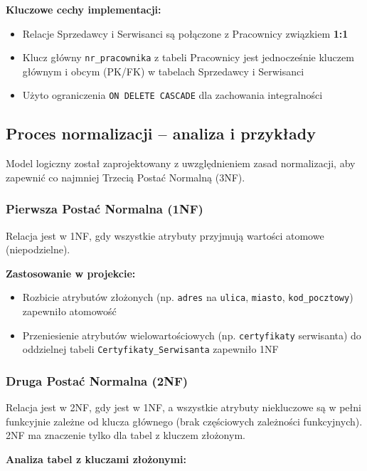 \documentclass[a4paper,titleauthor]{mwart}
\begin{document}
	\textbf{Kluczowe cechy implementacji:}
	\begin{itemize}
		\item Relacje Sprzedawcy i Serwisanci są połączone z Pracownicy związkiem \textbf{1:1}
		\item Klucz główny \texttt{nr\_pracownika} z tabeli Pracownicy jest jednocześnie kluczem głównym i obcym (PK/FK) w tabelach Sprzedawcy i Serwisanci
		\item Użyto ograniczenia \texttt{ON DELETE CASCADE} dla zachowania integralności
	\end{itemize}

	\subsection{Proces normalizacji -- analiza i przykłady}

	Model logiczny został zaprojektowany z uwzględnieniem zasad normalizacji, aby zapewnić co najmniej Trzecią Postać Normalną (3NF).

	\subsubsection{Pierwsza Postać Normalna (1NF)}

	Relacja jest w 1NF, gdy wszystkie atrybuty przyjmują wartości atomowe (niepodzielne).

	\textbf{Zastosowanie w projekcie:}
	\begin{itemize}
		\item Rozbicie atrybutów złożonych (np. \texttt{adres} na \texttt{ulica}, \texttt{miasto}, \texttt{kod\_pocztowy}) zapewniło atomowość
		\item Przeniesienie atrybutów wielowartościowych (np. \texttt{certyfikaty} serwisanta) do oddzielnej tabeli \texttt{Certyfikaty\_Serwisanta} zapewniło 1NF
	\end{itemize}

	\subsubsection{Druga Postać Normalna (2NF)}

	Relacja jest w 2NF, gdy jest w 1NF, a wszystkie atrybuty niekluczowe są w pełni funkcyjnie zależne od klucza głównego (brak częściowych zależności funkcyjnych). 2NF ma znaczenie tylko dla tabel z kluczem złożonym.

	\textbf{Analiza tabel z kluczami złożonymi:}
\end{document}

